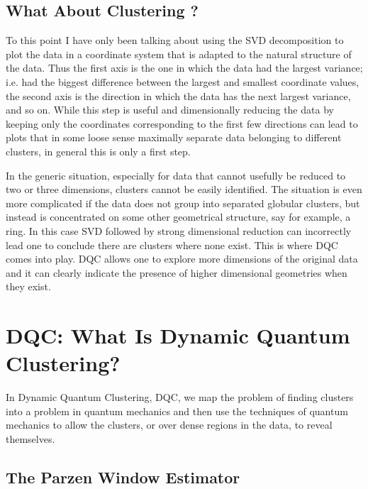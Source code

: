 \documentclass[fleqn,twoside]{article}
\begin{document}
\subsection{What About Clustering ?}

To this point I have only been talking about using the SVD
decomposition to plot the data in a coordinate system that is
adapted to the natural structure of the data. Thus the first axis is
the one in which the data had the largest variance; i.e. had the
biggest difference between the largest and smallest coordinate
values, the second axis is the direction in which the data has the
next largest variance, and so on.  While this step is useful and
dimensionally reducing the data by keeping only the coordinates
corresponding to the first few directions can lead to plots that in
some loose sense maximally separate data belonging to different
clusters, in general this is only a first step.

In the generic situation, especially for data that cannot usefully
be reduced to two or three dimensions, clusters cannot be easily
identified.  The situation is even more complicated if the data does
not group into separated globular clusters, but instead is
concentrated on some other geometrical structure, say for example, a
ring.  In this case SVD followed by strong dimensional reduction can
incorrectly lead one to conclude there are clusters where none
exist.  This is where DQC comes into play. DQC allows one to explore
more dimensions of the original data and it can clearly indicate the
presence of higher dimensional geometries when they exist.


\section{DQC: What Is Dynamic Quantum Clustering?}

In Dynamic Quantum Clustering, DQC, we map the problem of finding
clusters into a problem in quantum mechanics and then use the
techniques of quantum mechanics to allow the clusters, or over
dense regions in the data, to reveal themselves.

\subsection{The Parzen Window Estimator}
\end{document}
